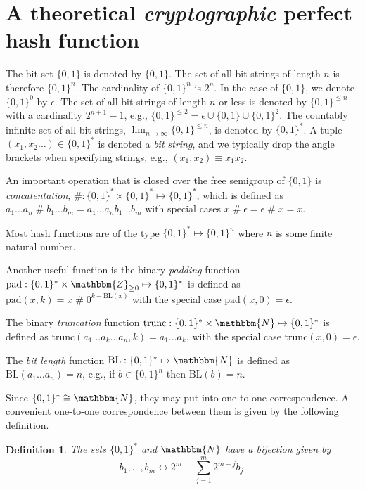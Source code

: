 \documentclass[hidelinks,11pt,final]{article}
\newcommand{\envnumstyle}{section}
\theoremstyle{plain}
\newtheorem{definition}{Definition}[\envnumstyle]
\newcommand{\cat}{\mathbin{\#}}
\newcommand{\BL}{\mathrm{BL}}
\begin{document}

\section{A theoretical \emph{cryptographic} perfect hash function}
The bit set $\{0,1\}$ is denoted by $\{0,1\}$.
The set of all bit strings of length $n$ is therefore $\{0,1\}^n$.
The cardinality of $\{0,1\}^n$ is $2^n$.
In the case of $\{0,1\}$, we denote $\{0,1\}^0$ by $\epsilon$.
The set of all bit strings of length $n$ or less is denoted by $\{0,1\}^{\leq n}$ with a cardinality $2^{n+1}-1$, e.g., $\{0,1\}^{\leq 2} = \epsilon \cup \{0,1\} \cup \{0,1\}^2$.
The countably infinite set of all bit strings, $\lim_{n \to \infty} \{0,1\}^{\leq n}$, is denoted by $\{0,1\}^{*}$.
A tuple $(x_1,x_2\ldots) \in \{0,1\}^{*}$ is denoted a \emph{bit string}, and we typically drop the angle brackets when specifying strings, e.g., $(x_1,x_2) \equiv x_1 x_2$.

An important operation that is closed over the free semigroup of $\{0,1\}$ is \emph{concatentation}, $\cat : \{0,1\}^* \times \{0,1\}^* \mapsto \{0,1\}^*$, which is defined as $a_1 \ldots a_n \cat b_1 \ldots b_m = a_1 \ldots a_n b_1 \ldots b_m$ with special cases $x \cat \epsilon = \epsilon \cat x = x$.

Most hash functions are of the type $\{0,1\}^* \mapsto \{0,1\}^n$ where $n$ is some finite natural number.

Another useful function is the binary \emph{padding} function
$\mathrm{pad} : \{0,1\}^* \times \mathbbm{Z}_{\geq 0} \mapsto \{0,1\}^*$ is defined as $\mathrm{pad}(x,k) = x \cat 0^{k-\mathrm{BL}(x)}$ with the special case $\mathrm{pad}(x,0) = \epsilon$.


The binary \emph{truncation} function $\mathrm{trunc} : \{0,1\}^* \times \mathbbm{N} \mapsto \{0,1\}^*$ is defined as $\mathrm{trunc}(a_1 \ldots a_k \ldots a_n, k) = a_1 \ldots a_k$, with the special case $\mathrm{trunc}(x,0) = \epsilon$.

The \emph{bit length} function $\mathrm{BL} : \{0,1\}^* \mapsto \mathbbm{N}$ is defined as $\BL(a_1 \ldots a_n) = n$, e.g., if $b \in \{0,1\}^{n}$ then $\mathrm{BL}(b) = n$.

Since $\{0,1\}^* \cong \mathbbm{N}$, they may put into one-to-one correspondence.
A convenient one-to-one correspondence between them is given by the following definition.
\begin{definition}
	\label{def:mapping}
	The sets $\{0,1\}^*$ and $\mathbbm{N}$ have a bijection given by
	\begin{equation}
	b_1,\ldots,b_m \longleftrightarrow 2^m + \sum_{j=1}^{m} 2^{m - j} b_j.
	\end{equation}
\end{definition}
\end{document}
